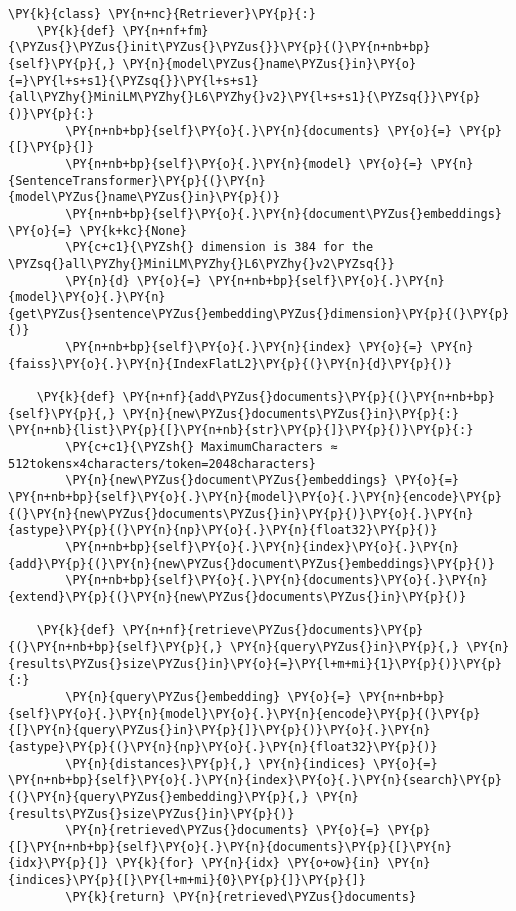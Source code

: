 \documentclass[11pt]{wseas}
\begin{document}
    \newpage

    \begin{tcolorbox}[breakable, size=fbox, boxrule=1pt, pad at break*=1mm,colback=cellbackground, colframe=cellborder]
\begin{Verbatim}[commandchars=\\\{\}]
\PY{k}{class} \PY{n+nc}{Retriever}\PY{p}{:}
    \PY{k}{def} \PY{n+nf+fm}{\PYZus{}\PYZus{}init\PYZus{}\PYZus{}}\PY{p}{(}\PY{n+nb+bp}{self}\PY{p}{,} \PY{n}{model\PYZus{}name\PYZus{}in}\PY{o}{=}\PY{l+s+s1}{\PYZsq{}}\PY{l+s+s1}{all\PYZhy{}MiniLM\PYZhy{}L6\PYZhy{}v2}\PY{l+s+s1}{\PYZsq{}}\PY{p}{)}\PY{p}{:}
        \PY{n+nb+bp}{self}\PY{o}{.}\PY{n}{documents} \PY{o}{=} \PY{p}{[}\PY{p}{]}
        \PY{n+nb+bp}{self}\PY{o}{.}\PY{n}{model} \PY{o}{=} \PY{n}{SentenceTransformer}\PY{p}{(}\PY{n}{model\PYZus{}name\PYZus{}in}\PY{p}{)}
        \PY{n+nb+bp}{self}\PY{o}{.}\PY{n}{document\PYZus{}embeddings} \PY{o}{=} \PY{k+kc}{None}
        \PY{c+c1}{\PYZsh{} dimension is 384 for the \PYZsq{}all\PYZhy{}MiniLM\PYZhy{}L6\PYZhy{}v2\PYZsq{}}
        \PY{n}{d} \PY{o}{=} \PY{n+nb+bp}{self}\PY{o}{.}\PY{n}{model}\PY{o}{.}\PY{n}{get\PYZus{}sentence\PYZus{}embedding\PYZus{}dimension}\PY{p}{(}\PY{p}{)}
        \PY{n+nb+bp}{self}\PY{o}{.}\PY{n}{index} \PY{o}{=} \PY{n}{faiss}\PY{o}{.}\PY{n}{IndexFlatL2}\PY{p}{(}\PY{n}{d}\PY{p}{)}
        
    \PY{k}{def} \PY{n+nf}{add\PYZus{}documents}\PY{p}{(}\PY{n+nb+bp}{self}\PY{p}{,} \PY{n}{new\PYZus{}documents\PYZus{}in}\PY{p}{:} \PY{n+nb}{list}\PY{p}{[}\PY{n+nb}{str}\PY{p}{]}\PY{p}{)}\PY{p}{:}
        \PY{c+c1}{\PYZsh{} MaximumCharacters ≈ 512tokens×4characters/token=2048characters}
        \PY{n}{new\PYZus{}document\PYZus{}embeddings} \PY{o}{=} \PY{n+nb+bp}{self}\PY{o}{.}\PY{n}{model}\PY{o}{.}\PY{n}{encode}\PY{p}{(}\PY{n}{new\PYZus{}documents\PYZus{}in}\PY{p}{)}\PY{o}{.}\PY{n}{astype}\PY{p}{(}\PY{n}{np}\PY{o}{.}\PY{n}{float32}\PY{p}{)}
        \PY{n+nb+bp}{self}\PY{o}{.}\PY{n}{index}\PY{o}{.}\PY{n}{add}\PY{p}{(}\PY{n}{new\PYZus{}document\PYZus{}embeddings}\PY{p}{)}
        \PY{n+nb+bp}{self}\PY{o}{.}\PY{n}{documents}\PY{o}{.}\PY{n}{extend}\PY{p}{(}\PY{n}{new\PYZus{}documents\PYZus{}in}\PY{p}{)}

    \PY{k}{def} \PY{n+nf}{retrieve\PYZus{}documents}\PY{p}{(}\PY{n+nb+bp}{self}\PY{p}{,} \PY{n}{query\PYZus{}in}\PY{p}{,} \PY{n}{results\PYZus{}size\PYZus{}in}\PY{o}{=}\PY{l+m+mi}{1}\PY{p}{)}\PY{p}{:}
        \PY{n}{query\PYZus{}embedding} \PY{o}{=} \PY{n+nb+bp}{self}\PY{o}{.}\PY{n}{model}\PY{o}{.}\PY{n}{encode}\PY{p}{(}\PY{p}{[}\PY{n}{query\PYZus{}in}\PY{p}{]}\PY{p}{)}\PY{o}{.}\PY{n}{astype}\PY{p}{(}\PY{n}{np}\PY{o}{.}\PY{n}{float32}\PY{p}{)}
        \PY{n}{distances}\PY{p}{,} \PY{n}{indices} \PY{o}{=} \PY{n+nb+bp}{self}\PY{o}{.}\PY{n}{index}\PY{o}{.}\PY{n}{search}\PY{p}{(}\PY{n}{query\PYZus{}embedding}\PY{p}{,} \PY{n}{results\PYZus{}size\PYZus{}in}\PY{p}{)}
        \PY{n}{retrieved\PYZus{}documents} \PY{o}{=} \PY{p}{[}\PY{n+nb+bp}{self}\PY{o}{.}\PY{n}{documents}\PY{p}{[}\PY{n}{idx}\PY{p}{]} \PY{k}{for} \PY{n}{idx} \PY{o+ow}{in} \PY{n}{indices}\PY{p}{[}\PY{l+m+mi}{0}\PY{p}{]}\PY{p}{]}
        \PY{k}{return} \PY{n}{retrieved\PYZus{}documents}
\end{Verbatim}
\end{tcolorbox}
\end{document}
